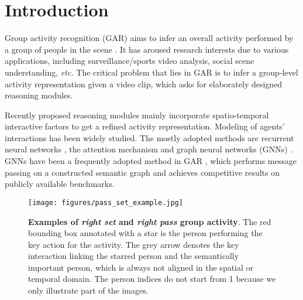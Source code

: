 \documentclass[10pt,twocolumn,letterpaper]{article}
\begin{document}
\section{Introduction}
Group activity recognition (GAR) aims to infer an overall activity performed by a group of people in the scene \cite{choi2009they,ibrahim2016hierarchical,bagautdinov2017social,yan2018pctdm,qi2018stagnet,wu2019learning,gavrilyuk2020actor,yuan2021learningcontext}. It has aroused research interests due to various applications, including surveillance/sports video analysis, social scene understanding, \textit{etc.} The critical problem that lies in GAR is to infer a group-level activity representation given a video clip, which asks for elaborately designed reasoning modules.


Recently proposed reasoning modules mainly incorporate spatio-temporal interactive factors to get a refined activity representation. Modeling of agents' interactions has been widely studied. The mostly adopted methods are recurrent neural networks \cite{alahi2016sociallstm,zellers2018neuralmotif}, the attention mechanism \cite{vemula2018socialattention,hoshen2017vain} and graph neural networks (GNNs) \cite{sun2019stochasticprediction,fu2019dual,xu2017iterativemessage}. GNNs have been a frequently adopted method in GAR \cite{qi2018stagnet,wu2019learning,yan2020higcin,pramono2020eccvempowering}, which performs message passing on a constructed semantic graph and achieves competitive results on publicly available benchmarks.







\begin{figure}[t]
\centering
\texttt{[image: figures/pass\_set\_example.jpg]} 
\caption{\textbf{Examples of \textit{right set} and \textit{right pass} group activity}. The red bounding box annotated with a star is the person performing the key action for the activity. The grey arrow denotes the key interaction linking the starred person and the semantically important person, which is always not aligned in the spatial or temporal domain. The person indices do not start from 1 because we only illustrate part of the images.}
\label{pass_set_example}
\vspace{-0.4cm}
\end{figure}
\end{document}
